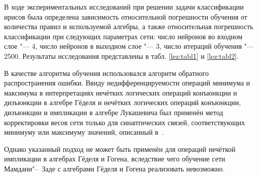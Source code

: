 В ходе экспериментальных исследований при решении задачи классификации
ирисов была определена зависимость относительной погрешности обучения от
количества правил и используемой алгебры, а также относительная погрешность
классификации при следующих параметрах сети: число нейронов во входном слое
"--- 4, число нейронов в выходном слое "--- 3, число итераций обучения "--- 2500.
Результаты исследования представлены в табл. \ref{lez:tabl1} и \ref{lez:tabl2}.

В качестве алгоритма обучения использовался алгоритм обратного
распространения ошибки. Ввиду недифференцируемости операций минимума и
максимума в интерпретациях нечётких логических операций конъюнкции и
дизъюнкции в алгебре Гёделя и нечётких логических операций конъюнкции,
дизъюнкции и импликации в алгебре Лукашевича был применён метод
корректировки весов сети только для синаптических связей, соответствующих
минимуму или максимуму значений, описанный в~\cite{soldat:bib3}.

Однако указанный подход не может быть применён для операций нечёткой
импликации в алгебрах Гёделя и Гогена, вследствие чего обучение сети
Мамдани"--~Заде с алгебрами Гёделя и Гогена реализовать невозможно.

